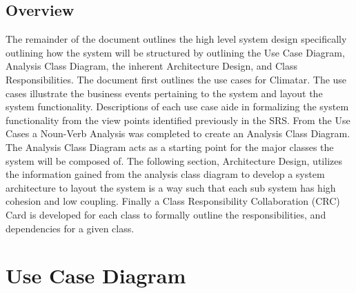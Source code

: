 \documentclass[]{article}
\begin{document}
\subsection{Overview}
\label{sub:overview}
The remainder of the document outlines the high level system design specifically outlining how the system will be structured by outlining the Use Case Diagram, Analysis Class Diagram, the inherent Architecture Design, and Class Responsibilities. The document first outlines the use cases for Climatar. The use cases illustrate the business events pertaining to the system and layout the system functionality. Descriptions of each use case aide in formalizing the system functionality from the view points identified previously in the SRS. From the Use Cases a Noun-Verb Analysis was completed to create an Analysis Class Diagram. The Analysis Class Diagram acts as a starting point for the major classes the system will be composed of. The following section, Architecture Design, utilizes the information gained from the analysis class diagram to develop a system architecture to layout the system is a way such that each sub system has high cohesion and low coupling. Finally a Class Responsibility Collaboration (CRC) Card is developed for each class to formally outline the responsibilities, and dependencies for a given class.

\vspace{20mm}


\section{Use Case Diagram}
\label{sec:use_case_diagram}
\end{document}
